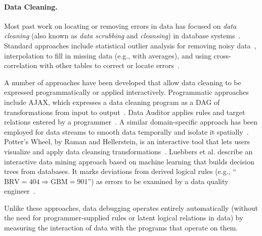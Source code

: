 
\paragraph{Data Cleaning.}
Most past work on locating or removing errors in data has focused
on \emph{data cleaning} (also known as \emph{data scrubbing}
and \emph{cleansing}) in database
systems~\cite{DBLP:journals/debu/RahmD00,han2006data}. Standard
approaches include statistical outlier analysis for removing noisy
data~\cite{1583581}, interpolation to fill in missing data (e.g., with
averages), and using cross-correlation with other tables to correct or
locate errors~\cite{Hernandez:1995:MPL:223784.223807}.




A number of approaches have been developed that allow data cleaning to
be expressed programmatically or applied interactively. Programmatic
approaches include AJAX, which expresses a data cleaning program as a
DAG of transformations from input to
output~\cite{Galhardas:2000:AED:342009.336568}. Data Auditor applies
rules and target relations entered by a
programmer~\cite{Golab:2010:DAE:1920841.1921060}. A similar
domain-specific approach has been employed for data streams to smooth
data temporally and isolate it spatially~\cite{1617508}. Potter's
Wheel, by Raman and Hellerstein, is an interactive tool that lets
users visualize and apply data cleansing
transformations~\cite{Raman:2001:PWI:645927.672045}. 
Luebbers et al. describe an interactive data mining approach based on
machine learning that builds decision trees from databases. It marks
deviations from derived logical rules (e.g., ``$\mbox{BRV} =
404 \Rightarrow \mbox{GBM} = 901$'') as errors to be examined by a
data quality engineer~\cite{Luebbers:2003:SDD:1315451.1315499}.

Unlike these approaches, data debugging operates entirely
automatically (without the need for programmer-supplied rules or
latent logical relations in data) by measuring the interaction of data
with the programs that operate on them.
 

